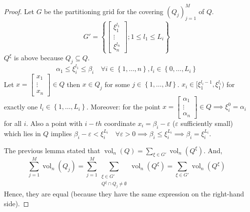 \documentclass{article}
\newcommand{\set}[1]{\left\{#1\right\}}
\DeclareMathOperator{\vol}{vol}  %
\begin{document}
\begin{proof}
  Let $G$ be the partitioning grid for the covering $(Q_j)_{j=1}^M$ of $Q$.
  \[ G' = \set{\begin{bmatrix}\xi_1^{l_1} \\ \vdots \\ \xi_n^{l_n} \end{bmatrix}; 1 \leq l_1 \leq L_i} \]
  $Q^\xi$ is above because $Q_j \subseteq Q$.
  \[ \alpha_1 \leq \xi_i^{l_1} \leq \beta_i \quad \forall i \in \set{1, \ldots, n}, l_i \in \set{0, \ldots, L_i} \]
  Let $x = \begin{bmatrix} x_1 \\ \vdots \\ x_n \end{bmatrix} \in Q$ then $x \in Q_j$ for some $j \in \set{1,\ldots,M}$.
  $x_i \in [\xi_1^{l_i-1}, \xi_1^{l_i})$ for exactly one $l_i \in \set{1,\ldots,L_i}$.
  Moreover: for the point $x = \begin{bmatrix} \alpha_1 \\ \vdots \\ \alpha_n \end{bmatrix} \in Q \implies \xi_i^0 = \alpha_i$ for all $i$.
  Also a point with $i-th$ coordinate $x_i = \beta_i - \varepsilon$ ($\varepsilon$ sufficiently small)
  which lies in $Q$ implies $\beta_i - \varepsilon < \xi_i^{L_i} \quad \forall \varepsilon > 0 \implies \beta_i \leq \xi_i^{L_i} \implies \beta_i = \xi_i^{L_i}$.

  The previous lemma stated that $\vol_n(Q) = \sum_{\xi \in G'} \vol_n(Q^\xi)$. And,
  \[ \sum_{j=1}^M \vol_n(Q_j) = \sum_{j=1}^M \sum_{\substack{\xi \in G' \\ Q^\xi \cap Q_j \neq \emptyset}} \vol_n(Q^\xi) = \sum_{\xi \in G'} \vol_n(Q^\xi) \]
  Hence, they are equal (because they have the same expression on the right-hand side).
\end{proof}
\end{document}
